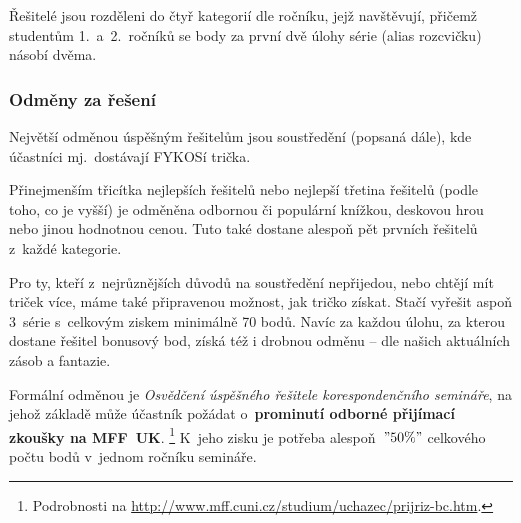 \documentclass[fykos]{fksempty}
\begin{document}
Řešitelé jsou rozděleni do čtyř kategorií dle ročníku,
jejž navštěvují,
přičemž studentům 1.~a~2.~ročníků se body za první dvě úlohy série (alias rozcvičku) násobí dvěma.


\subsubsection{Odměny za řešení}

Největší odměnou úspěšným řešitelům jsou soustředění (popsaná dále),
kde účastníci mj.~dostávají FYKOSí trička.

Přinejmenším třicítka nejlepších řešitelů
nebo nejlepší třetina řešitelů (podle toho, co je vyšší)
je odměněna odbornou či populární knížkou,
deskovou hrou nebo jinou hodnotnou cenou.
Tuto také dostane alespoň pět prvních řešitelů z~každé kategorie.

Pro ty, kteří z~nejrůznějších důvodů na soustředění nepřijedou,
nebo chtějí mít triček více, máme také připravenou možnost,
jak tričko získat.
Stačí vyřešit aspoň 3~série s~celkovým ziskem minimálně 70 bodů.
Navíc za každou úlohu, za kterou dostane řešitel bonusový bod,
získá též i drobnou odměnu -- dle našich aktuálních zásob a fantazie.

Formální odměnou je \emph{Osvědčení úspěšného řešitele korespondenčního semináře},
na jehož základě může účastník požádat o~\textbf{prominutí odborné přijímací zkoušky na MFF~UK}.%
\footnote{Podrobnosti na \url{http://www.mff.cuni.cz/studium/uchazec/prijriz-bc.htm}.}
K~jeho zisku je potřeba alespoň~$"50 \%"$ celkového počtu bodů v~jednom ročníku semináře.


\end{document}

